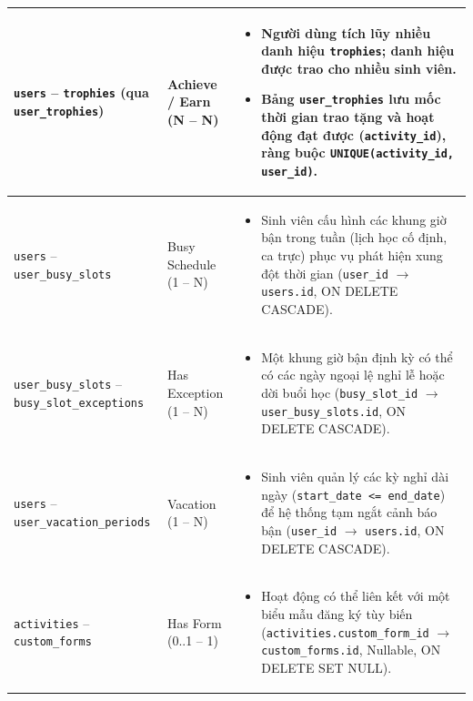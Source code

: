 \begin{longtable}{|p{}|p{}|p{}|}
    \texttt{users} -- \texttt{trophies} \newline (qua \texttt{user\_trophies}) & Achieve / Earn \newline (N -- N) & 
    \begin{itemize}
        \item Người dùng tích lũy nhiều danh hiệu \texttt{trophies}; danh hiệu được trao cho nhiều sinh viên.
        \item Bảng \texttt{user\_trophies} lưu mốc thời gian trao tặng và hoạt động đạt được (\texttt{activity\_id}), ràng buộc \texttt{UNIQUE(activity\_id, user\_id)}.
    \end{itemize} \\ \hline

    \texttt{users} -- \texttt{user\_busy\_slots} & Busy Schedule \newline (1 -- N) & 
    \begin{itemize}
        \item Sinh viên cấu hình các khung giờ bận trong tuần (lịch học cố định, ca trực) phục vụ phát hiện xung đột thời gian (\texttt{user\_id} $\rightarrow$ \texttt{users.id}, ON DELETE CASCADE).
    \end{itemize} \\ \hline

    \texttt{user\_busy\_slots} -- \texttt{busy\_slot\_exceptions} & Has Exception \newline (1 -- N) & 
    \begin{itemize}
        \item Một khung giờ bận định kỳ có thể có các ngày ngoại lệ nghỉ lễ hoặc dời buổi học (\texttt{busy\_slot\_id} $\rightarrow$ \texttt{user\_busy\_slots.id}, ON DELETE CASCADE).
    \end{itemize} \\ \hline

    \texttt{users} -- \texttt{user\_vacation\_periods} & Vacation \newline (1 -- N) & 
    \begin{itemize}
        \item Sinh viên quản lý các kỳ nghỉ dài ngày (\texttt{start\_date <= end\_date}) để hệ thống tạm ngắt cảnh báo bận (\texttt{user\_id} $\rightarrow$ \texttt{users.id}, ON DELETE CASCADE).
    \end{itemize} \\ \hline

    \texttt{activities} -- \texttt{custom\_forms} & Has Form \newline (0..1 -- 1) & 
    \begin{itemize}
        \item Hoạt động có thể liên kết với một biểu mẫu đăng ký tùy biến (\texttt{activities.custom\_form\_id} $\rightarrow$ \texttt{custom\_forms.id}, Nullable, ON DELETE SET NULL).
    \end{itemize} \\ \hline


\end{longtable}
